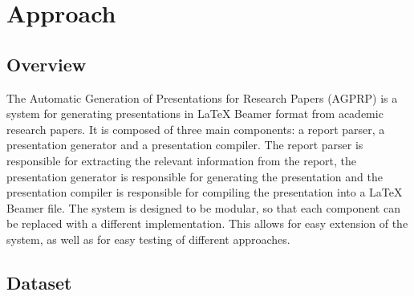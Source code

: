 \chapter{Approach}
\label{ch:approach}


\section{Overview}

The Automatic Generation of Presentations for Research Papers (AGPRP) is a system for generating presentations in \LaTeX{} Beamer format from academic research papers. It is composed of three main components: a report parser, a presentation generator and a presentation compiler. The report parser is responsible for extracting the relevant information from the report, the presentation generator is responsible for generating the presentation and the presentation compiler is responsible for compiling the presentation into a \LaTeX{} Beamer file. The system is designed to be modular, so that each component can be replaced with a different implementation. This allows for easy extension of the system, as well as for easy testing of different approaches.

\section{Dataset}

